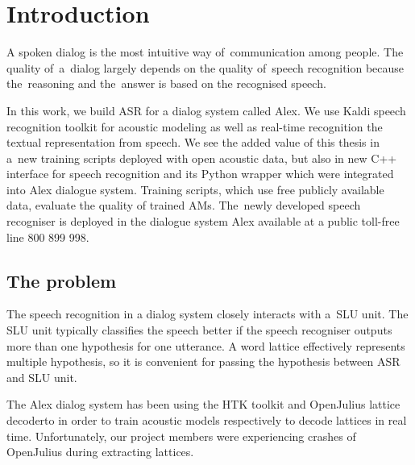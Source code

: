 \chapter{Introduction}
\label{cha:intro}

A spoken dialog is the most intuitive way of~communication among people. 
The quality of~a~dialog largely depends on the quality of~speech recognition because the~reasoning and the~answer is based on the recognised speech. 

In this work, we build \acl{ASR} for a dialog system called Alex. 
We use Kaldi speech recognition toolkit\cite{povey2011kaldi} for acoustic modeling as well as real-time recognition the textual representation from speech.
We see the added value of this thesis in a~new training scripts deployed with open acoustic data\cite{korvas_2014}, but also in new C++ interface for speech recognition and its Python wrapper which were integrated into Alex dialogue system. 
Training scripts, which use free publicly available data, evaluate the quality of trained \aclp{AM}.
The~newly developed speech recogniser is deployed in the dialogue system Alex available at a public toll-free line 800 899 998. 


\section{The problem} 
\label{sec:problem}

The speech recognition in a dialog system closely interacts with a~\acl{SLU} unit.
The \ac{SLU} unit typically classifies the speech better if the speech recogniser outputs more than one hypothesis for one utterance. 
A word lattice effectively represents multiple hypothesis, so it is convenient for passing the hypothesis between \ac{ASR} and \ac{SLU} unit.

The Alex dialog system has been using the \ac{HTK} toolkit\cite{young94htk} and OpenJulius\cite{lee2009julius} lattice decoderto in order to train acoustic models respectively to decode lattices in real time. 
Unfortunately, our project members were experiencing crashes of OpenJulius during extracting lattices.

